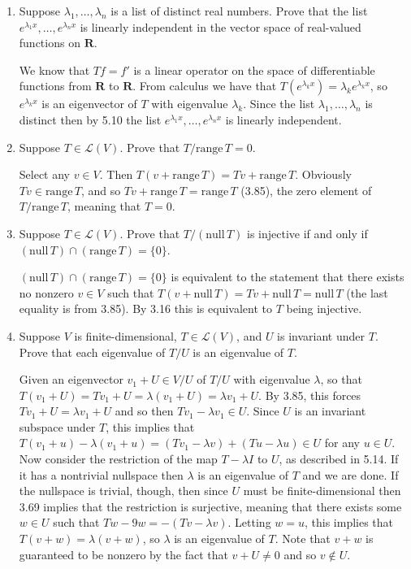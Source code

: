 \documentclass{book}
\begin{document}
\begin{enumerate}
\item Suppose \(\lambda_1,\dots,\lambda_n\) is a list of distinct real numbers.  Prove that the list \(e^{\lambda_1x},\dots,e^{\lambda_nx}\) is linearly independent in the vector space of real-valued functions on \(\textbf{R}\).

We know that \(Tf=f'\) is a linear operator on the space of differentiable functions from \(\textbf{R}\) to \(\textbf{R}\).  From calculus we have that \(T(e^{\lambda_k x})=\lambda_k e^{\lambda_kx}\), so \(e^{\lambda_k x}\) is an eigenvector of \(T\) with eigenvalue \(\lambda_k\).  Since the list \(\lambda_1,\dots,\lambda_n\) is distinct then by 5.10 the list \(e^{\lambda_1x},\dots,e^{\lambda_nx}\) is linearly independent.

\item Suppose \(T \in \mathcal{L}(V)\).  Prove that \(T/\text{range} \, T=0\).

Select any \(v \in V\).  Then \(T(v+\text{range} \, T)=Tv+\text{range} \, T\).  Obviously \(Tv \in \text{range} \, T\), and so \(Tv+\text{range} \, T = \text{range} \, T\) (3.85), the zero element of \(T/\text{range} \, T\), meaning that \(T=0\).

\item Suppose \(T \in \mathcal{L}(V)\).  Prove that \(T/(\textrm{null} \, T)\) is injective if and only if \((\textrm{null} \, T) \cap (\textrm{range} \, T) = \{0\}\).

\((\textrm{null} \, T) \cap (\text{range} \, T) = \{0\}\) is equivalent to the statement that there exists no nonzero  \(v \in V\) such that \(T(v+\text{null} \, T)=Tv+\text{null} \, T=\text{null} \, T\) (the last equality is from 3.85).  By 3.16 this is equivalent to \(T\) being injective.

\item Suppose \(V\) is finite-dimensional, \(T \in \mathcal{L}(V)\), and \(U\) is invariant under \(T\).  Prove that each eigenvalue of \(T/U\) is an eigenvalue of \(T\).

Given an eigenvector \(v_1+U \in V/U\) of \(T/U\) with eigenvalue \(\lambda\), so that \(T(v_1+U)=Tv_1+U=\lambda(v_1+U)=\lambda v_1+U\).  By 3.85, this forces \(Tv_1+U=\lambda v_1+U\) and so then \(Tv_1-\lambda v_1 \in U\).  Since \(U\) is an invariant subspace under \(T\), this implies that \(T(v_1+u)-\lambda(v_1+u) = (Tv_1-\lambda v)+(Tu-\lambda u) \in U\) for any \(u \in U\).  Now consider the restriction of the map \(T-\lambda I\) to \(U\), as described in 5.14.  If it has a nontrivial nullspace then \(\lambda\) is an eigenvalue of \(T\) and we are done.  If the nullspace is trivial, though, then since \(U\) must be finite-dimensional then 3.69 implies that the restriction is surjective, meaning that there exists some \(w \in U\) such that \(Tw-9w=-(Tv-\lambda v)\).  Letting \(w=u\), this implies that \(T(v+w)=\lambda (v+w)\), so \(\lambda\) is an eigenvalue of \(T\).  Note that \(v+w\) is guaranteed to be nonzero by the fact that \(v+U \neq 0\) and so \(v \notin U\).


\end{enumerate}
\end{document}
